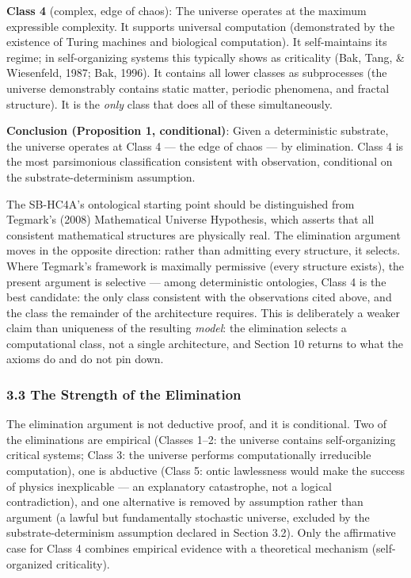 \documentclass[
]{article}
\begin{document}
\textbf{Class 4} (complex, edge of chaos): The universe operates at the
maximum expressible complexity. It supports universal computation
(demonstrated by the existence of Turing machines and biological
computation). It self-maintains its regime; in self-organizing systems
this typically shows as criticality (Bak, Tang, \& Wiesenfeld, 1987;
Bak, 1996). It contains all lower classes as subprocesses (the universe
demonstrably contains static matter, periodic phenomena, and fractal
structure). It is the \emph{only} class that does all of these
simultaneously.

\textbf{Conclusion (Proposition 1, conditional)}: Given a deterministic
substrate, the universe operates at Class 4 --- the edge of chaos --- by
elimination. Class 4 is the most parsimonious classification consistent
with observation, conditional on the substrate-determinism assumption.

The SB-HC4A's ontological starting point should be distinguished from
Tegmark's (2008) Mathematical Universe Hypothesis, which asserts that
all consistent mathematical structures are physically real. The
elimination argument moves in the opposite direction: rather than
admitting every structure, it selects. Where Tegmark's framework is
maximally permissive (every structure exists), the present argument is
selective --- among deterministic ontologies, Class 4 is the best
candidate: the only class consistent with the observations cited above,
and the class the remainder of the architecture requires. This is
deliberately a weaker claim than uniqueness of the resulting
\emph{model}: the elimination selects a computational class, not a
single architecture, and Section 10 returns to what the axioms do and do
not pin down.

\hypertarget{the-strength-of-the-elimination}{%
\subsubsection{3.3 The Strength of the
Elimination}\label{the-strength-of-the-elimination}}

The elimination argument is not deductive proof, and it is conditional.
Two of the eliminations are empirical (Classes 1--2: the universe
contains self-organizing critical systems; Class 3: the universe
performs computationally irreducible computation), one is abductive
(Class 5: ontic lawlessness would make the success of physics
inexplicable --- an explanatory catastrophe, not a logical
contradiction), and one alternative is removed by assumption rather than
argument (a lawful but fundamentally stochastic universe, excluded by
the substrate-determinism assumption declared in Section 3.2). Only the
affirmative case for Class 4 combines empirical evidence with a
theoretical mechanism (self-organized criticality).
\end{document}
